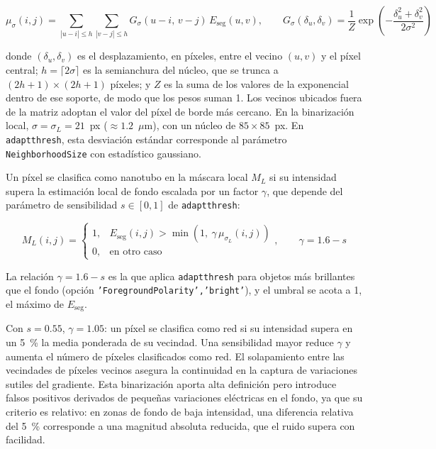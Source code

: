 \begin{equation}
\mu_{\sigma}(i,j) = \sum_{|u-i| \le h} \sum_{|v-j| \le h} G_{\sigma}(u-i,\, v-j)\, E_{\mathrm{seg}}(u,v), \qquad
G_{\sigma}(\delta_u, \delta_v) = \frac{1}{Z}\exp\left(-\frac{\delta_u^2 + \delta_v^2}{2\sigma^2}\right)
\label{eq:gauss}
\end{equation}

donde $(\delta_u, \delta_v)$ es el desplazamiento, en píxeles, entre el vecino $(u,v)$ y el píxel central; $h = \lceil 2\sigma \rceil$ es la semianchura del núcleo, que se trunca a $(2h+1)\times(2h+1)$ píxeles; y $Z$ es la suma de los valores de la exponencial dentro de ese soporte, de modo que los pesos suman 1. Los vecinos ubicados fuera de la matriz adoptan el valor del píxel de borde más cercano. En la binarización local, $\sigma = \sigma_L = 21$~px ($\approx 1.2$~$\mu$m), con un núcleo de $85\times85$~px. En \texttt{adaptthresh}, esta desviación estándar corresponde al parámetro \texttt{NeighborhoodSize} con estadístico gaussiano.

Un píxel se clasifica como nanotubo en la máscara local $M_L$ si su intensidad supera la estimación local de fondo escalada por un factor $\gamma$, que depende del parámetro de sensibilidad $s \in [0,1]$ de \texttt{adaptthresh}:

\begin{equation}
M_L(i,j) = \begin{cases} 1, & E_{\mathrm{seg}}(i,j) > \min\left(1,\ \gamma\, \mu_{\sigma_L}(i,j)\right) \\ 0, & \text{en otro caso} \end{cases}, \qquad \gamma = 1.6 - s
\label{eq:bin_local}
\end{equation}

La relación $\gamma = 1.6 - s$ es la que aplica \texttt{adaptthresh} para objetos más brillantes que el fondo (opción \texttt{'ForegroundPolarity','bright'}), y el umbral se acota a 1, el máximo de $E_{\mathrm{seg}}$.

Con $s = 0.55$, $\gamma = 1.05$: un píxel se clasifica como red si su intensidad supera en un 5~\% la media ponderada de su vecindad. Una sensibilidad mayor reduce $\gamma$ y aumenta el número de píxeles clasificados como red. El solapamiento entre las vecindades de píxeles vecinos asegura la continuidad en la captura de variaciones sutiles del gradiente. Esta binarización aporta alta definición pero introduce falsos positivos derivados de pequeñas variaciones eléctricas en el fondo, ya que su criterio es relativo: en zonas de fondo de baja intensidad, una diferencia relativa del 5~\% corresponde a una magnitud absoluta reducida, que el ruido supera con facilidad.

